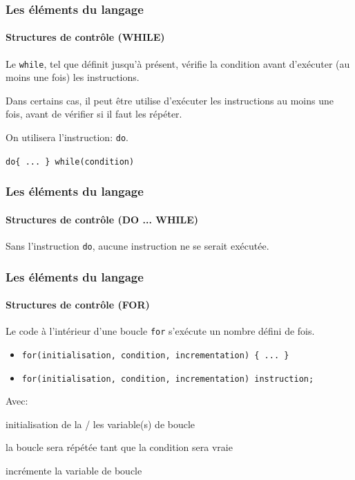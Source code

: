 		\begin{frame}[fragile]
			\frametitle{Les éléments du langage}
			\framesubtitle{Structures de contrôle (WHILE)}
			\begin{remarque}
				Le \lstinline|while|, tel que définit jusqu'à présent, vérifie la condition avant d'exécuter (au moins une fois) les instructions. 
				
				Dans certains cas, il peut être utilise d'exécuter les instructions au moins une fois, avant de vérifier si il faut les répéter.
			\end{remarque}
			\pause{}
			On utilisera l'instruction: \lstinline|do|.
			\pause{}
			\begin{syntaxe}
				\lstinline|do{ ... } while(condition)|
			\end{syntaxe}
			
		\end{frame}
	
		\begin{frame}[fragile]
			\frametitle{Les éléments du langage}
			\framesubtitle{Structures de contrôle (DO ... WHILE)}
			\begin{example}
				
			\end{example}
			\pause{}
			\begin{remarque}
				Sans l'instruction \lstinline|do|, aucune instruction ne se serait exécutée.
			\end{remarque}
			
		\end{frame}
	
		\begin{frame}[fragile]
			\frametitle{Les éléments du langage}
			\framesubtitle{Structures de contrôle (FOR)}
			\begin{fact}
				Le code à l'intérieur d'une boucle \lstinline|for| s'exécute un nombre défini de fois.
			\end{fact}
			\pause{}
			\begin{syntaxe}
				\begin{itemize}
					\item \lstinline|for(initialisation, condition, incrementation) { ... }|
					\item \lstinline|for(initialisation, condition, incrementation) instruction;|
				\end{itemize}
			\end{syntaxe}
			Avec:
			\pause{}
			\begin{description}[<+->]
				\item[initialisation:] initialisation de la / les variable(s) de boucle
				\item[condition:] la boucle sera répétée tant que la condition sera vraie
				\item[incrementation:] incrémente la variable de boucle
			\end{description}
			
		\end{frame}
	
